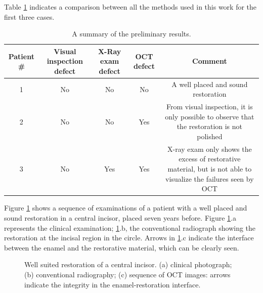 \documentclass[12pt,twoside,english]{book}
\renewcommand{\~}{\perispomeni}%
\providecommand{\tabularnewline}{\\}
\numberwithin{equation}{section}
\numberwithin{figure}{section}
\begin{document}
Table \ref{table:preliminary results} indicates a comparison between all the methods used in this work for the first three cases.
\begin{table}[H]
\noindent \begin{centering}
\begin{tabular}{ccccc}
\hline 
Patient \# & %
\begin{minipage}[t]{0.15\linewidth}%
Visual inspection defect%
\end{minipage} & %
\begin{minipage}[t]{0.15\linewidth}%
X-Ray exam defect%
\end{minipage} & %
\begin{minipage}[t]{0.1\linewidth}%
OCT defect%
\end{minipage} & Comment\tabularnewline
\hline
\hline 
1 & No & No & No & %
\begin{minipage}[t]{0.4\linewidth}%
A well placed and sound restoration%
\end{minipage}\tabularnewline
2 & No & No & Yes & %
\begin{minipage}[t]{0.4\linewidth}%
From visual inspection, it is only possible to observe that the restoration
is not polished%
\end{minipage}\tabularnewline
3 & No & Yes & Yes & %
\begin{minipage}[t]{0.4\linewidth}%
X-ray exam only shows the excess of restorative material, but is not
able to visualize the failures seen by OCT%
\end{minipage}\tabularnewline
\hline
\end{tabular}\caption{A summary of the preliminary results.\label{table:preliminary results}}
\par\end{centering}
\end{table}

Figure \ref{fig:good restoration} shows a sequence of examinations of a patient with a well placed and sound restoration in a central incisor, placed seven years before. Figure \ref{fig:good restoration}.a represents the clinical examination; \ref{fig:good restoration}.b, the conventional radiograph showing the restoration at the incisal region in the circle. Arrows in \ref{fig:good restoration}.c indicate the interface between the enamel and the restorative material, which can be clearly seen.
\begin{figure}[h]
\noindent \centering{}
\caption{Well suited restoration of a central incisor. (a) clinical photograph; (b) conventional radiography; (c) sequence of OCT images: arrows indicate the integrity in the enamel-restoration interface.}
\label{fig:good restoration}
\end{figure}
\end{document}
